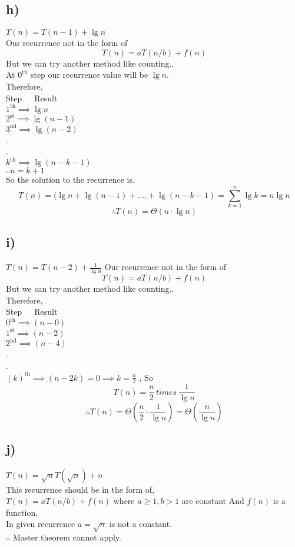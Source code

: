 \documentclass[a4paper, 11pt]{article}
\begin{document}
\subsection*{h)}
$T(n) = T(n-1) + \lg n$\\
Our recurrence not in the form of
$$T(n) = aT(n/b) +f(n) $$
But we can try another method like counting..\\
At $0^{\text{th}}$ step our recurrence value will be $\lg n$.\\
Therefore,\\
Step \,\,\,\,\,  Result\\
$1^{\text{th}} \implies \lg n$\\
$2^{\text{st}} \implies \lg (n-1)$\\
$3^{\text{nd}} \implies \lg (n-2)$\\
.\\
.\\  
$k^{\text{th}} \implies \lg (n-k-1)$\\
$\therefore n=k+1 $\\
So the solution to the recurrence is,
$$T(n) = (\lg n + \lg (n-1) + ....+\lg(n-k-1) = \sum_{k=1}^{n} \lg k = n\lg n$$
$$\therefore T(n) = \Theta(n \cdot \lg n)$$

\subsection*{i)}
$T(n) = T(n-2) + \frac{1}{\lg n}$
Our recurrence not in the form of
$$T(n) = aT(n/b) +f(n) $$
But we can try another method like counting..\\
Therefore,\\
Step \,\,\,\,\,  Result\\
$0^{\text{th}} \implies (n-0)$\\
$1^{\text{st}} \implies (n-2)$\\
$2^{\text{nd}} \implies (n-4)$\\
.\\
.\\  
$(k)^{\text{th}} \implies (n-2k) = 0 \implies k=\frac{n}{2}$ , So
$$T(n) = \frac{n}{2} \, times \, \frac{1}{\lg n}$$
$$\therefore T(n)= \Theta (\frac{n}{2} \cdot \frac{1}{\lg n}) = \Theta (\frac{n}{\lg n})$$

\subsection*{j)}
$T(n) = \sqrt{n} T(\sqrt{n}) + n$\\
This recurrence should be in the form of,\\
$T(n) = aT(n/b) + f(n)$ where $a \ge 1 , b > 1 $ are constant And $f(n)$ is a function. \\
In given recurrence $a=\sqrt{n}$ is not a constant.\\
$\therefore $ Master theorem cannot apply.
\end{document}
